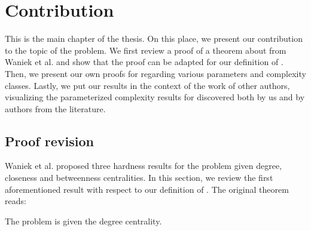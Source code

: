 \chapter{Contribution}\label{chapter:contribution}

This is the main chapter of the thesis.
On this place, we present our contribution to the topic of the \HL problem.
We first review a proof of a theorem about \HLdeg from Waniek et al. \cite{Waniek2017} and show
that the proof can be adapted for our definition of \HL.
Then, we present our own proofs for \HLdeg regarding various parameters and complexity classes.
Lastly, we put our results in the context of the work of other authors,
visualizing the parameterized complexity results for \HLdeg discovered both by us and by authors
from the literature.


\section{Proof revision}\label{section:proofRevision}

Waniek et al. \cite{Waniek2021full} proposed three hardness results for the \HL problem given degree, closeness and betweenness
centralities. In this section, we review the first aforementioned result with respect to our definition of \HLshort.
The original theorem reads:

\begin{theorem}
    The \HL problem is \NPc given the degree centrality.
\end{theorem}

